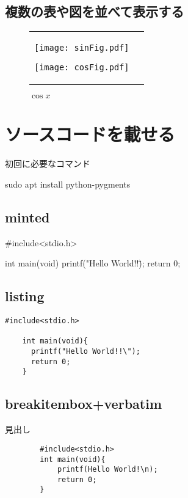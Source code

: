 \documentclass[a4j,titlepage,dvipdfmx]{jsarticle}   %
\begin{document}
  \subsection{複数の表や図を並べて表示する}
  \begin{figure}[H]
    \begin{tabular}{cc}
      \begin{minipage}{0.5\hsize}
        \centering
        \texttt{[image: sinFig.pdf]}
        \caption{$\sin{x}$}
        \label{fig:sin}
      \end{minipage}
      \begin{minipage}{0.5\hsize}
        \centering
        \texttt{[image: cosFig.pdf]}
        \caption{$\cos{x}$}
        \label{fig:cos}
      \end{minipage}
    \end{tabular}
  \end{figure}
  \section{ソースコードを載せる}
  \begin{listing}[htbp]
    \caption{初回に必要なコマンド}
    \begin{shellcode}
      sudo apt install python-pygments
    \end{shellcode}
  \end{listing}
  \subsection{minted}
  \begin{myMinted}
    #include<stdio.h>

    int main(void){
      printf("Hello World!!\");
      return 0;
    }
  \end{myMinted}

  \subsection{listing}
  \begin{lstlisting}[caption=listingのテスト,label=listTest]
    #include<stdio.h>

    int main(void){
      printf("Hello World!!\");
      return 0;
    }
  \end{lstlisting}

  \subsection{breakitembox+verbatim}
  \begin{breakitembox}[l]{見出し}
    \begin{verbatim}
        #include<stdio.h>
        int main(void){
            printf(Hello World!\n);
            return 0;
        }
    \end{verbatim}
\end{breakitembox}
\end{document}

